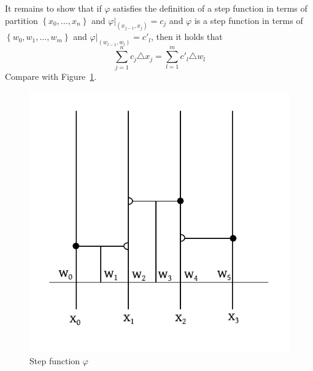 \documentclass[a4paper,landscape,twocolumn]{article}
\theoremstyle{definition}
\newcommand\set[1]{\left\{#1\right\}}
\begin{document}
It remains to show that if $\varphi$ satisfies the definition of a step function in terms of
partition $\set{x_0,\ldots,x_n}$ and $\varphi|_{(x_{j-1}, x_j)} = c_j$
and $\varphi$ is a step function in terms of $\set{w_0,w_1,\ldots,w_m}$
and $\varphi|_{(w_{l-1},w_l)} = c'_l$, then it holds that
\[ \sum_{j=1}^n c_j \triangle x_j = \sum_{l=1}^m c'_l \triangle w_l \]
Compare with Figure~\ref{img:step-function}.

\begin{figure}[!h]
  \begin{center}
    \includegraphics{img/step-function.pdf}
    \caption{Step function $\varphi$}
    \label{img:step-function}
  \end{center}
\end{figure}
\end{document}
